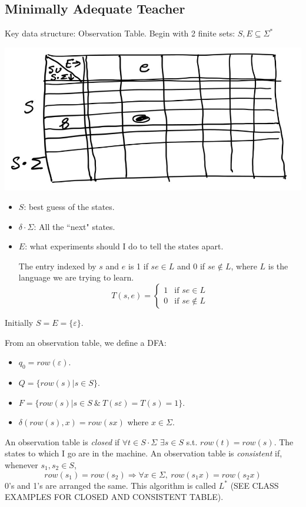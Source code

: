 \documentclass{article}
\begin{document}
\subsection{Minimally Adequate Teacher}
Key data structure: Observation Table. Begin with 2 finite sets: $S,E \subseteq \Sigma^*$
\begin{center}
    \includegraphics[scale=0.6]{minimally_adequate_teacher.jpg}
\end{center}
\begin{itemize}
    \item $S$: best guess of the states.
    \item $\delta \cdot \Sigma$: All the ``next" states.
    \item $E$: what experiments should I do to tell the states apart.
    
    The entry indexed by $s$ and $e$ is 1 if $se \in L$ and 0 if $se \notin L$, where $L$ is the language we are trying to learn.
    \[T(s,e) = \begin{cases}
    1 & \text{if } se \in L\\
    0& \text{if } se \notin L
    \end{cases}\]
\end{itemize}
Initially $S = E = \{\varepsilon\}$.

\bigbreak\noindent From an observation table, we define a DFA:
\begin{itemize}
    \item $q_0 = row(\varepsilon)$.
    \item $Q = \{row(s) | s \in S\}$.
    \item $F = \{row(s)| s \in S\ \&\ T(s\varepsilon) = T(s) = 1\}$.
    \item $\delta(row(s),x) = row(sx)$ where $x \in \Sigma$.
\end{itemize}
An observation table is \textit{closed} if $\forall t \in S \cdot \Sigma$ $\exists s \in S$ s.t. $row(t) = row(s)$. The states to which I go are in the machine.
\bigbreak\noindent
An observation table is \textit{consistent} if, whenever $s_1,s_2 \in S$,
\[row(s_1) = row(s_2) \Rightarrow \forall x \in \Sigma,\ row(s_1x) = row(s_2x)\]
0's and 1's are arranged the same.
\bigbreak\noindent
This algorithm is called $L^*$ (SEE CLASS EXAMPLES FOR CLOSED AND CONSISTENT TABLE).
\end{document}

